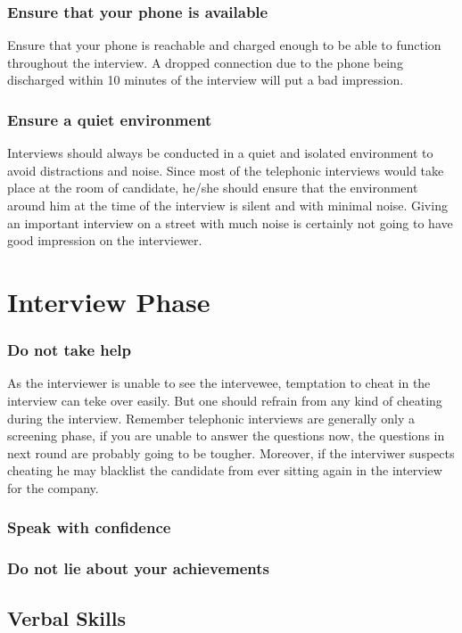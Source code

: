 \documentclass[a4paper,12pt]{report}
\begin{document}
\subsubsection{Ensure that your phone is available}
Ensure that your phone is reachable and charged enough to be able to function throughout the interview. A dropped
connection due to the phone being discharged within 10 minutes of the interview will put a bad impression.
\subsubsection{Ensure a quiet environment}
Interviews should always be conducted in a quiet and isolated environment to avoid distractions and noise.
Since most of the telephonic interviews would take place at the room of candidate, he/she should ensure that the environment 
around him at the time of the interview is silent and with minimal noise. Giving an important interview on a 
street with much noise is certainly not going to have good impression on the interviewer.

\section{Interview Phase}
\subsubsection{Do not take help}
As the interviewer is unable to see the intervewee, temptation to cheat in the interview can teke over easily.
But one should refrain from any kind of cheating during the interview. Remember telephonic interviews are generally
only a screening phase, if you are unable to answer the questions now, the questions in next round are probably 
going to be tougher. Moreover, if the interviwer suspects cheating he may blacklist the candidate from ever sitting
again in the interview for the company.
\subsubsection{Speak with confidence}

\subsubsection{Do not lie about your achievements}

\subsection{Verbal Skills}
\end{document}
